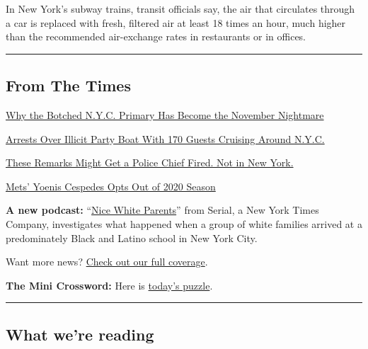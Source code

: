 In New York's subway trains, transit officials say, the air that
circulates through a car is replaced with fresh, filtered air at least
18 times an hour, much higher than the recommended air-exchange rates in
restaurants or in offices.

\begin{center}\rule{0.5\linewidth}{\linethickness}\end{center}

\hypertarget{from-the-times}{%
\subsection{From The Times}\label{from-the-times}}

\href{https://www.nytimes3xbfgragh.onion/2020/08/03/nyregion/nyc-mail-ballots-voting.html}{Why
the Botched N.Y.C. Primary Has Become the November Nightmare}

\href{https://www.nytimes3xbfgragh.onion/2020/08/02/nyregion/liberty-belle-illegal-party.html}{Arrests
Over Illicit Party Boat With 170 Guests Cruising Around N.Y.C.}

\href{https://www.nytimes3xbfgragh.onion/2020/08/03/nyregion/police-shea-de-blasio-nyc.html}{These
Remarks Might Get a Police Chief Fired. Not in New York.}

\href{https://www.nytimes3xbfgragh.onion/2020/08/02/sports/baseball/Yoenis-cespedes-opt-out-rule.html}{Mets'
Yoenis Cespedes Opts Out of 2020 Season}

\textbf{A new podcast:}
``\href{https://www.nytimes3xbfgragh.onion/2020/07/30/podcasts/nice-white-parents-serial.html}{Nice
White Parents}'' from Serial, a New York Times Company, investigates
what happened when a group of white families arrived at a predominately
Black and Latino school in New York City.

Want more news?
\href{https://www.nytimes3xbfgragh.onion/section/nyregion}{Check out our
full coverage}.

\textbf{The Mini Crossword:} Here is
\href{https://www.nytimes3xbfgragh.onion/crosswords/game/mini}{today's
puzzle}.

\begin{center}\rule{0.5\linewidth}{\linethickness}\end{center}

\hypertarget{what-were-reading}{%
\subsection{What we're reading}\label{what-were-reading}}

